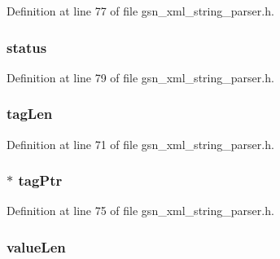 Definition at line 77 of file gsn\_\-xml\_\-string\_\-parser.h.

\hypertarget{a00443_aa237e3d47ed706281c4aeb5c54e7cb03}{
\subsubsection[{status}]{ {\bf status}}}
\label{a00443_aa237e3d47ed706281c4aeb5c54e7cb03}


Definition at line 79 of file gsn\_\-xml\_\-string\_\-parser.h.

\hypertarget{a00443_a6ef02d18ce527c9522753f065487fcd5}{
\subsubsection[{tagLen}]{ {\bf tagLen}}}
\label{a00443_a6ef02d18ce527c9522753f065487fcd5}


Definition at line 71 of file gsn\_\-xml\_\-string\_\-parser.h.

\hypertarget{a00443_a7cf402fdd3455c46d9073935e5b44c77}{
\subsubsection[{tagPtr}]{$\ast$ {\bf tagPtr}}}
\label{a00443_a7cf402fdd3455c46d9073935e5b44c77}


Definition at line 75 of file gsn\_\-xml\_\-string\_\-parser.h.

\hypertarget{a00443_a145cf46a49a2c1c6f2cfd0df668efdee}{
\subsubsection[{valueLen}]{ {\bf valueLen}}}
\label{a00443_a145cf46a49a2c1c6f2cfd0df668efdee}


